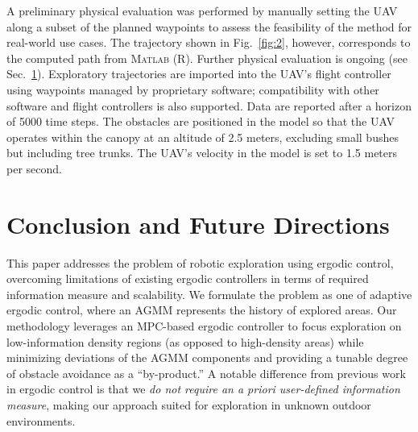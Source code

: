 \documentclass[letterpaper, 10 pt, conference, twoside]{IEEEtran}
\theoremstyle{definition}
\begin{document}
A preliminary physical evaluation was performed by manually setting the UAV along a subset of the planned waypoints to assess the feasibility of the method for real-world use cases. The trajectory shown in Fig.~\ref{fig:2}, however, corresponds to the computed path from \textsc{Matlab} (R). 
Further physical evaluation is ongoing (see Sec.~\ref{sec:conc}). Exploratory trajectories are imported into the UAV's flight controller using waypoints managed by proprietary software; compatibility with other software and flight controllers is also supported. Data are reported after a horizon of 5000 time steps. The obstacles are positioned in the model so that the UAV operates within the canopy at an altitude of 2.5 meters, excluding small bushes but including tree trunks. The UAV's velocity in the model is set to 1.5 meters per second.

\section{Conclusion and Future Directions}\label{sec:conc}
\noindent
This paper addresses the problem of robotic exploration using ergodic control, overcoming limitations of existing ergodic controllers in terms of required information measure and scalability. We formulate the problem as one of adaptive ergodic control, where an AGMM represents the history of explored areas. Our methodology leverages an MPC-based ergodic controller to focus exploration on low-information density regions (as opposed to high-density areas) while minimizing deviations of the AGMM components and providing a tunable degree of obstacle avoidance as a ``by-product.'' %
A notable difference from previous work in ergodic control is that we \textit{do not require an a priori user-defined information measure}, making our approach suited for exploration in unknown outdoor environments.
\end{document}
